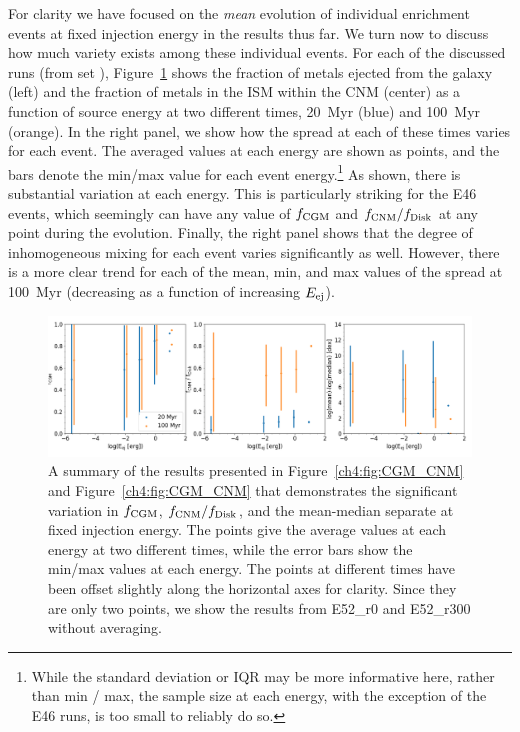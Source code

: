 For clarity we have focused on the \textit{mean} evolution of individual enrichment events at fixed injection energy in the results thus far. We turn now to discuss how much variety exists among these individual events. For each of the discussed runs (from set \runonenu), Figure~\ref{ch4:fig:CGM_CNM_variance} shows the fraction of metals ejected from the galaxy (left) and the fraction of metals in the ISM within the CNM (center) as a function of source energy at two different times, 20~Myr (blue) and 100~Myr (orange). In the right panel, we show how the spread at each of these times varies for each event. The averaged values at each energy are shown as points, and the bars denote the min/max value for each event energy.\footnote{While the standard deviation or IQR may be more informative here, rather than min / max, the sample size at each energy, with the exception of the E46 runs, is too small to reliably do so.} As shown, there is substantial variation at each energy. This is particularly striking for the E46 events, which seemingly can have any value of $f_{\rm CGM}$ and $f_{\rm CNM} / f_{\rm Disk}$ at any point during the evolution. Finally, the right panel shows that the degree of inhomogeneous mixing for each event varies significantly as well. However, there is a more clear trend for each of the mean, min, and max values of the spread at 100~Myr (decreasing as a function of increasing $E_{\rm ej}$).

 \begin{figure}
   \centering
   \includegraphics[width=0.975\linewidth]{figures/ch4/II_Eej_CNM_avg}
   \caption{A summary of the results presented in Figure~\ref{ch4:fig:CGM_CNM} and Figure~\ref{ch4:fig:CGM_CNM} that demonstrates the significant variation in $f_{\rm CGM}$, $f_{\rm CNM} / f_{\rm Disk}$, and the mean-median separate at fixed injection energy. The points give the average values at each energy at two different times, while the error bars show the min/max values at each energy. The points at different times have been offset slightly along the horizontal axes for clarity. Since they are only two points, we show the results from \runone E52\_r0 and \runone E52\_r300 without averaging.}
   \label{ch4:fig:CGM_CNM_variance}
 \end{figure}


